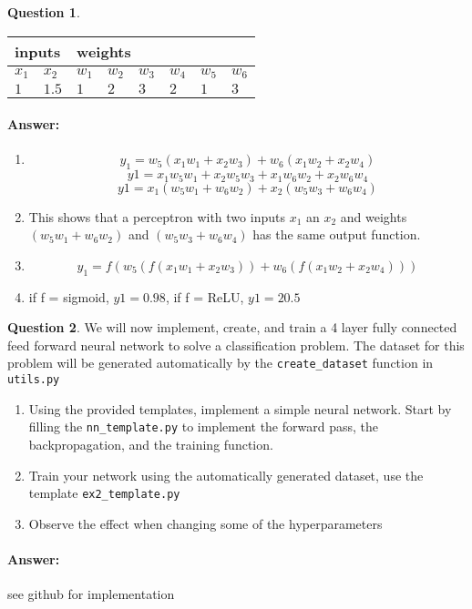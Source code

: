 \documentclass[11pt,a4paper]{article}
\theoremstyle{definition}%
\newtheorem{Q}{Question}[] %
\newcommand{\reponse}[1]{%
\ifthenelse {\boolean{corrige}} {\paragraph{Answer:} \color{darkblue}   #1\color{black}} {}
}
\begin{document}
\begin{Q}
\begin{enumerate}
    \begin{center}
    \begin{tabular}{|l|l|l|l|l|l|l|l|}
    \hline
    \multicolumn{2}{|l|}{inputs} & \multicolumn{6}{l|}{weights}                  \\ \hline
    $x_1$         & $x_2$        & $w_1$ & $w_2$ & $w_3$ & $w_4$ & $w_5$ & $w_6$ \\ \hline
    $1$           & $1.5$        & $1$   & $2$   & $3$   & $2$   & $1$   & $3$   \\ \hline
    \end{tabular}
    \end{center}

\end{enumerate}

\reponse{

\begin{enumerate}
    \item $$y_1 = w_5 ( x_1 w_1 + x_2 w_3 ) + w_6 ( x_1 w_2 + x_2 w_4 )$$
        $$y1 = x_1 w_5 w_1 + x_2 w_5 w_3 + x_1 w_6 w_2 + x_2 w_6 w_4$$
        $$y1 = x_1 (w_5 w_1 + w_6 w_2) + x_2 (w_5 w_3 + w_6 w_4)  $$
    \item This shows that a perceptron with two inputs $x_1$ an $x_2$ and weights 
        $(w_5 w_1 + w_6 w_2)$ and $(w_5 w_3 + w_6 w_4)$ has the same output function.
    \item $$y_1 = f(w_5 ( f(x_1 w_1 + x_2 w_3 )) + w_6 ( f(x_1 w_2 + x_2 w_4 )))$$
    \item if f = sigmoid, $y1 = 0.98$, if f = ReLU, $y1 = 20.5$

\end{enumerate}

}

\end{Q}

\begin{Q}
    We will now implement, create, and train a 4 layer fully connected feed forward neural network
    to solve a classification problem.
    The dataset for this problem will be generated automatically by the \verb!create_dataset! function
    in \verb!utils.py!
    \begin{enumerate}
        \item Using the provided templates, implement a simple neural network.
            Start by filling the \verb!nn_template.py! to implement the forward pass,
            the backpropagation, and the training function.
        \item Train your network using the automatically generated dataset, use the template \verb!ex2_template.py!
        \item Observe the effect when changing some of the hyperparameters 
    \end{enumerate}
    \reponse{
        see github for implementation
    }
\end{Q}
\end{document}
